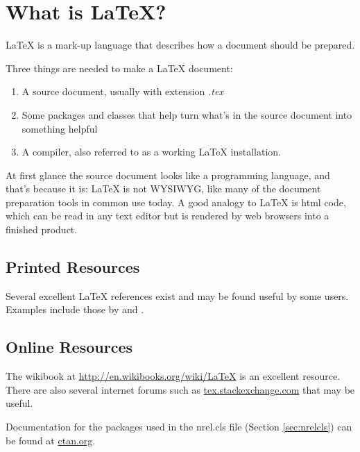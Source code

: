 \chapter{What is LaTeX?}
LaTeX is a mark-up language that describes how a document should be prepared.

Three things are needed to make a LaTeX document:
\begin{enumerate}
\item A source document, usually with extension \emph{.tex}
\item Some packages and classes that help turn what's in the source document into something helpful
\item A compiler, also referred to as a working LaTeX installation.
\end{enumerate}

At first glance the source document looks like a programming language, and that's because it is: LaTeX is not WYSIWYG, like many of the document preparation tools in common use today. A good analogy to LaTeX is html code, which can be read in any text editor but is rendered by web browsers into a finished product.

\section{Printed Resources}
Several excellent LaTeX references exist and may be found useful by some users. Examples include those by \citet{Knuth_1984_a} and \citet{Lamport_1986_a}.

\section{Online Resources}
The wikibook at \href{http://en.wikibooks.org/wiki/LaTeX}{http://en.wikibooks.org/wiki/LaTeX} is an excellent resource. There are also several internet forums such as \href{tex.stackexchange.com}{tex.stackexchange.com} that may be useful.

Documentation for the packages used in the nrel.cls file (Section \ref{sec:nrelcls}) can be found at \href{ctan.org}{ctan.org}.
